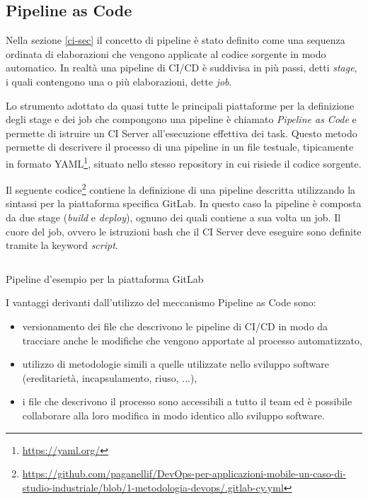 \subsection{Pipeline as Code}
Nella sezione \ref{ci-sec} il concetto di pipeline è stato definito come una sequenza ordinata di elaborazioni che vengono applicate al codice sorgente in modo automatico. In realtà una pipeline di CI/CD è suddivisa in più passi, detti \textit{stage}, i quali contengono una o più elaborazioni, dette \textit{job}.

Lo strumento adottato da quasi tutte le principali piattaforme per la definizione degli stage e dei job che compongono una pipeline è chiamato \textit{Pipeline as Code} e permette di istruire un CI Server all'esecuzione effettiva dei task. Questo metodo permette di descrivere il processo di una pipeline in un file testuale, tipicamente in formato YAML\footnote{\href{https://yaml.org/}{https://yaml.org/}}, situato nello stesso repository in cui risiede il codice sorgente.

Il seguente codice\footnote{\href{https://github.com/paganellif/DevOps-per-applicazioni-mobile-un-caso-di-studio-industriale/blob/1-metodologia-devops/.gitlab-cy.yml}{https://github.com/paganellif/DevOps-per-applicazioni-mobile-un-caso-di-studio-industriale/blob/1-metodologia-devops/.gitlab-cy.yml}} contiene la definizione di una pipeline descritta utilizzando la sintassi per la piattaforma specifica GitLab. In questo caso la pipeline è composta da due stage (\textit{build} e \textit{deploy}), ognuno dei quali contiene a sua volta un job. Il cuore del job, ovvero le istruzioni bash che il CI Server deve eseguire sono definite tramite la keyword \textit{script}.

\begin{listing}[H]
    \inputminted{yaml}{code/3-pipelineexample}
    \caption{Pipeline d'esempio per la piattaforma GitLab}
\end{listing}

I vantaggi derivanti dall'utilizzo del meccanismo Pipeline as Code sono:
\begin{itemize}
    \item versionamento dei file che descrivono le pipeline di CI/CD in modo da tracciare anche le modifiche che vengono apportate al processo automatizzato,
    \item utilizzo di metodologie simili a quelle utilizzate nello sviluppo software (ereditarietà, incapsulamento, riuso, ...),
    \item i file che descrivono il processo sono accessibili a tutto il team ed è possibile collaborare alla loro modifica in modo identico allo sviluppo software.
\end{itemize}

